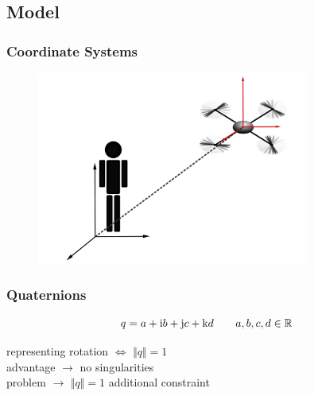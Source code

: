 	\begin{frame}
		\section{Model}
		\frametitle{Coordinate Systems}
			\begin{figure}[p]
				\centering
				\includegraphics[width=0.8\textwidth]{images/Koordinatensysteme.pdf}
				\label{fig:Koordinatensysteme}
		\end{figure}
	\end{frame}

	
	\begin{frame}
		\frametitle{Quaternions}
		\begin{block}{}
			\[ q = a + \textup{i}b+\textup{j}c+\textup{k}d \qquad a, b, c, d \in \mathbb{R} \]
			\vspace{.1ex}
			\end{block}
			
			\vspace{1ex}
			 representing rotation \( \Leftrightarrow \) \( \Vert q \Vert = 1 \) \\
			\vspace{1ex}			
			\onslide<3-> advantage \(\rightarrow\) no singularities \\
			\vspace{1ex}
			\onslide<4-> problem \(\rightarrow\) \( \Vert q \Vert = 1 \) additional constraint
	\end{frame}
	
